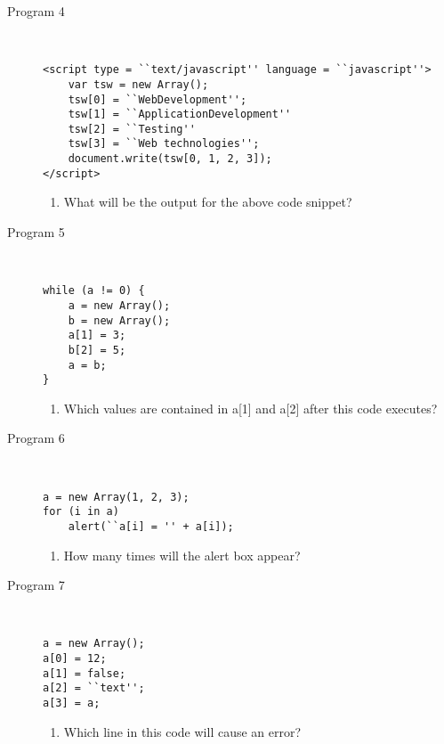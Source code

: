 \documentclass[11pt,a4paper]{article}
\def\AnswerBox{\fbox{\begin{minipage}{4in}\hfill\vspace{0.5in}\end{minipage}}}
\begin{document}
\begin{description}
\item [Program 4]\
\begin{lstlisting}
<script type = ``text/javascript'' language = ``javascript''>
    var tsw = new Array();
    tsw[0] = ``WebDevelopment'';
    tsw[1] = ``ApplicationDevelopment''
    tsw[2] = ``Testing''
    tsw[3] = ``Web technologies'';
    document.write(tsw[0, 1, 2, 3]);
</script>
\end{lstlisting}

\AnswerBox

\begin{enumerate}[label=\bfseries Q\arabic*:]\itemsep10pt
\item What will be the output for the above code snippet?
\end{enumerate}

\item [Program 5]\

\begin{lstlisting}
while (a != 0) {
    a = new Array();
    b = new Array();
    a[1] = 3;
    b[2] = 5;
    a = b;
}
\end{lstlisting}

\AnswerBox

\begin{enumerate}[label=\bfseries Q\arabic*:]\itemsep10pt
\item Which values are contained in a[1] and a[2] after this code executes? 
\end{enumerate}

\item [Program 6]\
\begin{lstlisting}
a = new Array(1, 2, 3);
for (i in a) 
    alert(``a[i] = '' + a[i]);
\end{lstlisting}

\AnswerBox

\begin{enumerate}[label=\bfseries Q\arabic*:]\itemsep10pt
\item How many times will the alert box appear? 
\end{enumerate}

\item [Program 7]\
\begin{lstlisting}
a = new Array();
a[0] = 12;
a[1] = false;
a[2] = ``text'';
a[3] = a; 
\end{lstlisting}
\AnswerBox

\begin{enumerate}[label=\bfseries Q\arabic*:]\itemsep10pt
\item Which line in this code will cause an error? 
\end{enumerate}

\end{description}
\end{document}
